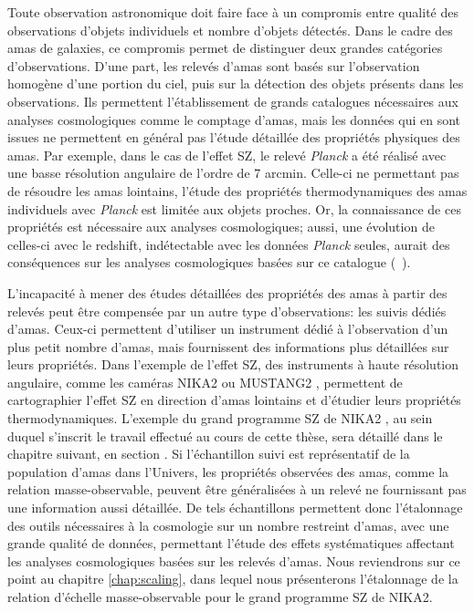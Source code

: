 Toute observation astronomique doit faire face à un compromis entre qualité des observations d'objets individuels et nombre d'objets détectés.
Dans le cadre des amas de galaxies, ce compromis permet de distinguer deux grandes catégories d'observations.
D'une part, les relevés d'amas sont basés sur l'observation homogène d'une portion du ciel, puis sur la détection des objets présents dans les observations.
Ils permettent l'établissement de grands catalogues nécessaires aux analyses cosmologiques comme le comptage d'amas, mais les données qui en sont issues ne permettent en général pas l'étude détaillée des propriétés physiques des amas.
Par exemple, dans le cas de l'effet SZ, le relevé \textit{Planck} \cite{planck_collaboration_planck_2016-2} a été réalisé avec une basse résolution angulaire de l'ordre de 7 arcmin.
Celle-ci ne permettant pas de résoudre les amas lointains, l'étude des propriétés thermodynamiques des amas individuels avec \textit{Planck} est limitée aux objets proches.
Or, la connaissance de ces propriétés est nécessaire aux analyses cosmologiques; aussi, une évolution de celles-ci avec le redshift, indétectable avec les données \textit{Planck} seules, aurait des conséquences sur les analyses cosmologiques basées sur ce catalogue (\eg\ \cite{ruppin_impact_2019-1}).

L'incapacité à mener des études détaillées des propriétés des amas à partir des relevés peut être compensée par un autre type d'observations: les suivis dédiés d'amas.
Ceux-ci permettent d'utiliser un instrument dédié à l'observation d'un plus petit nombre d'amas, mais fournissent des informations plus détaillées sur leurs propriétés.
Dans l'exemple de l'effet SZ, des instruments à haute résolution angulaire, comme les caméras NIKA2 \cite{adam_nika2_2018,perotto_calibration_2020} ou MUSTANG2 \cite{dicker_mustang2_2014}, permettent de cartographier l'effet SZ en direction d'amas lointains et d'étudier leurs propriétés thermodynamiques.
L'exemple du grand programme SZ de NIKA2 \cite{mayet_cluster_2020}, au sein duquel s'inscrit le travail effectué au cours de cette thèse, sera détaillé dans le chapitre suivant, en section .
Si l'échantillon suivi est représentatif de la population d'amas dans l'Univers, les propriétés observées des amas, comme la relation masse-observable, peuvent être généralisées à un relevé ne fournissant pas une information aussi détaillée.
De tels échantillons permettent donc l'étalonnage des outils nécessaires à la cosmologie sur un nombre restreint d'amas, avec une grande qualité de données, permettant l'étude des effets systématiques affectant les analyses cosmologiques basées sur les relevés d'amas.
Nous reviendrons sur ce point au chapitre \ref{chap:scaling}, dans lequel nous présenterons l'étalonnage de la relation d'échelle masse-observable pour le grand programme SZ de NIKA2.

